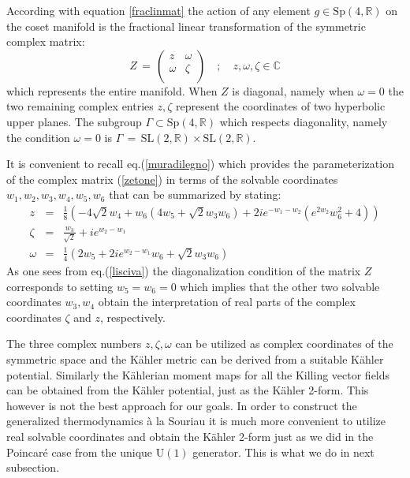 \documentclass[10pt,a4paper]{article}
\begin{document}
According with equation \ref{fraclinmat} the action of any element $g\in \mathrm{Sp(4,\mathbb{R})}$ on the coset manifold is
the  fractional linear transformation of the symmetric complex matrix:
\begin{equation}\label{zetone}
  Z \, = \,\left(
\begin{array}{cc}
 z & \omega  \\
 \omega  & \zeta  \\
\end{array}
\right) \quad ; \quad z,\omega,\zeta \in \mathbb{C}
\end{equation}
which represents  the entire manifold. When $Z$ is diagonal, namely when $\omega = 0$ the two remaining complex entries $z,\zeta$ represent the
coordinates of two hyperbolic upper planes. The subgroup $\Gamma \subset \mathrm{Sp(4,\mathbb{R})}$ which respects diagonality, namely the
condition $\omega =0$ is $\Gamma \, = \, \mathrm{SL(2,\mathbb{R})} \times \mathrm{SL(2,\mathbb{R}) }$.
\par
It is convenient to recall eq.(\ref{muradilegno}) which provides the parameterization of the complex
matrix (\ref{zetone}) in terms of the solvable coordinates $w_1,w_2,w_3, w_4,w_5,w_6$ that can be summarized by stating:
\begin{eqnarray}\label{lisciva}
  z &=& \frac{1}{8} \left(-4 \sqrt{2} w_4+w_6 \left(4 w_5+\sqrt{2} w_3 w_6\right)+2 i
   e^{-w_1-w_2} \left(e^{2 w_2} w_6^2+4\right)\right) \nonumber\\
  \zeta &=& \frac{w_3}{\sqrt{2}}+i e^{w_2-w_1} \nonumber\\
 \omega &=& \frac{1}{4} \left(2 w_5+2 i e^{w_2-w_1} w_6+\sqrt{2} w_3 w_6\right)
\end{eqnarray}
As one sees from eq.(\ref{lisciva}) the diagonalization condition of the matrix $Z$ corresponds to setting $w_5 = w_6 =0$ which implies that the
other two solvable coordinates $w_3,w_4$ obtain the interpretation of real parts of the complex coordinates $\zeta$ and $z$, respectively.
\par
The three complex numbers $z,\zeta,\omega$ can be utilized as complex coordinates of the symmetric space and the
K\"ahler metric can be derived from a suitable K\"ahler potential. Similarly the K\"ahlerian moment maps for all the Killing vector fields can be obtained from the K\"ahler potential, just as the K\"ahler 2-form. This however is not the best approach for our goals. In order to construct the generalized thermodynamics {\`a} la Souriau it is much more convenient to utilize real solvable coordinates and obtain the K\"ahler 2-form just as we did in the Poincar\'e case from the unique $\mathrm{U(1)}$ generator. This is what we do in next subsection.
\end{document}
